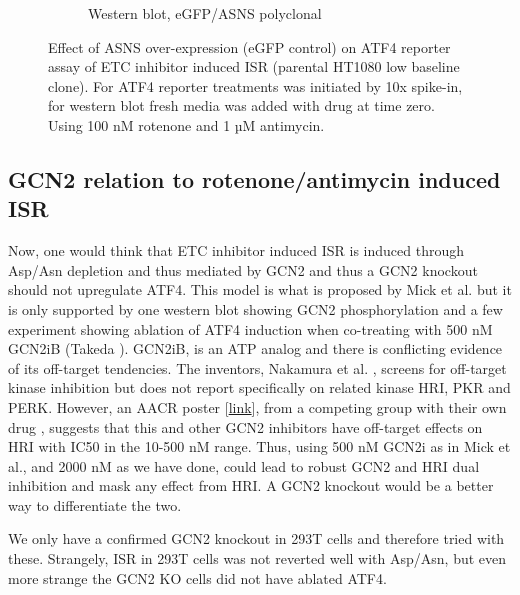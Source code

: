 \begin{figure}[ht]
\begin{subfigure}[b]{0.6\textwidth}
         \caption{Western blot, eGFP/ASNS polyclonal}
         \label{fig:sapp:ISR:HT1080_ISR_ASNS_OE}
     \end{subfigure}
        \caption[ASNS OE, rotenone/antimycin induced ISR]{
        Effect of ASNS over-expression (eGFP control) on ATF4 reporter assay of ETC inhibitor induced ISR (parental HT1080 low baseline clone).
        For ATF4 reporter treatments was initiated by 10x spike-in, for western blot fresh media was added with drug at time zero.
        Using 100 nM rotenone and 1 µM antimycin.
        }
        \label{fig:sapp:ISR:ASNS_ISR}
\end{figure}







\FloatBarrier
\subsection{GCN2 relation to rotenone/antimycin induced ISR}
Now, one would think that ETC inhibitor induced ISR is induced through Asp/Asn depletion and thus mediated by GCN2 and thus a GCN2 knockout should not upregulate ATF4.
This model is what is proposed by Mick et al. \cite{Mick2020-kf} but it is only supported by one western blot showing GCN2 phosphorylation and a few experiment showing ablation of ATF4 induction when co-treating with 500 nM GCN2iB (Takeda \cite{Nakamura2018-mt}).
GCN2iB, is an ATP analog and there is conflicting evidence of its off-target tendencies.
The inventors, Nakamura et al. \cite{Nakamura2018-mt}, screens for off-target kinase inhibition but does not report specifically on related kinase HRI, PKR and PERK.
However, an AACR poster [\href{https://rapt.com/wp-content/uploads/2019/04/FLX-Bio-GCN2-poster-AACR-2019.pdf}{link}], from a competing group with their own drug \cite{Jackson2022-wv}, suggests that this and other GCN2 inhibitors have off-target effects on HRI with IC50 in the 10-500 nM range.
Thus, using 500 nM GCN2i as in Mick et al., and 2000 nM as we have done, could lead to robust GCN2 and HRI dual inhibition and mask any effect from HRI.
A GCN2 knockout would be a better way to differentiate the two.

We only have a confirmed GCN2 knockout in 293T cells and therefore tried with these.
Strangely, ISR in 293T cells was not reverted well with Asp/Asn, but even more strange the GCN2 KO cells did not have ablated ATF4.

